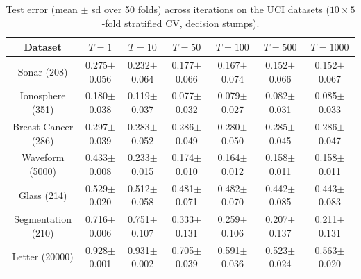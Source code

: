 \begin{table}[!ht]
\caption{Test error (mean $\pm$ sd over 50 folds) across iterations on the UCI datasets ($10\times5$-fold stratified CV, decision stumps).}\label{tb3}
\footnotesize\setlength{\tabcolsep}{3pt}
\begin{tabular}{|c|c|c|c|c|c|c|}
\hline
Dataset & $T{=}1$ & $T{=}10$ & $T{=}50$ & $T{=}100$ & $T{=}500$ & $T{=}1000$ \\ \hline
Sonar (208) & 0.275$\pm$0.056 & 0.232$\pm$0.064 & 0.177$\pm$0.066 & 0.167$\pm$0.074 & 0.152$\pm$0.066 & 0.152$\pm$0.067 \\
Ionosphere (351) & 0.180$\pm$0.038 & 0.119$\pm$0.037 & 0.077$\pm$0.032 & 0.079$\pm$0.027 & 0.082$\pm$0.031 & 0.085$\pm$0.033 \\
Breast Cancer (286) & 0.297$\pm$0.039 & 0.283$\pm$0.052 & 0.286$\pm$0.049 & 0.280$\pm$0.050 & 0.285$\pm$0.045 & 0.286$\pm$0.047 \\
Waveform (5000) & 0.433$\pm$0.008 & 0.233$\pm$0.015 & 0.174$\pm$0.010 & 0.164$\pm$0.012 & 0.158$\pm$0.011 & 0.158$\pm$0.011 \\
Glass (214) & 0.529$\pm$0.020 & 0.512$\pm$0.058 & 0.481$\pm$0.071 & 0.482$\pm$0.070 & 0.442$\pm$0.085 & 0.443$\pm$0.083 \\
Segmentation (210) & 0.716$\pm$0.006 & 0.751$\pm$0.107 & 0.333$\pm$0.131 & 0.259$\pm$0.106 & 0.207$\pm$0.137 & 0.211$\pm$0.131 \\
Letter (20000) & 0.928$\pm$0.001 & 0.931$\pm$0.002 & 0.705$\pm$0.039 & 0.591$\pm$0.036 & 0.523$\pm$0.024 & 0.563$\pm$0.020 \\
\hline
\end{tabular}
\end{table}

